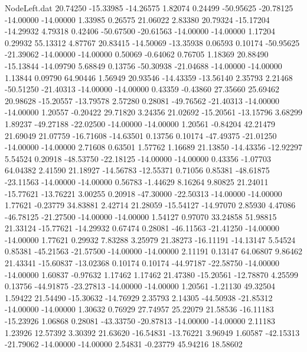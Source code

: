 \begin{filecontents}{NodeLeft.dat}
  20.74250  -15.33985  -14.26575     1.82074    0.24499  -50.95625  -20.78125  -14.00000  -14.00000    1.33985    0.26575   21.06022    2.83380
  20.79324  -15.17204  -14.29932     4.79318    0.42406  -50.67500  -20.61563  -14.00000  -14.00000    1.17204    0.29932   55.13312    4.87767
  20.83415  -14.50069  -13.35938     0.06593    0.10174  -50.95625  -21.39062  -14.00000  -14.00000    0.50069   -0.64062    0.76705    1.18369
  20.88490  -15.13844  -14.09790     5.68849    0.13756  -50.30938  -21.04688  -14.00000  -14.00000    1.13844    0.09790   64.90446    1.56949
  20.93546  -14.43359  -13.56140     2.35793    2.21468  -50.51250  -21.40313  -14.00000  -14.00000    0.43359   -0.43860   27.35660   25.69462
  20.98628  -15.20557  -13.79578     2.57280    0.28081  -49.76562  -21.40313  -14.00000  -14.00000    1.20557   -0.20422   29.71820    3.24356
  21.02692  -15.20561  -13.15796     3.68299    1.89237  -49.27188  -22.02500  -14.00000  -14.00000    1.20561   -0.84204   42.21479   21.69049
  21.07759  -16.71608  -14.63501     0.13756    0.10174  -47.49375  -21.01250  -14.00000  -14.00000    2.71608    0.63501    1.57762    1.16689
  21.13850  -14.43356  -12.92297     5.54524    0.20918  -48.53750  -22.18125  -14.00000  -14.00000    0.43356   -1.07703   64.04382    2.41590
  21.18927  -14.56783  -12.55371     0.71056    0.85381  -48.61875  -23.11563  -14.00000  -14.00000    0.56783   -1.44629    8.16264    9.80825
  21.24011  -15.77621  -13.76221     3.00255    0.20918  -47.30000  -22.50313  -14.00000  -14.00000    1.77621   -0.23779   34.83881    2.42714
  21.28059  -15.54127  -14.97070     2.85930    4.47086  -46.78125  -21.27500  -14.00000  -14.00000    1.54127    0.97070   33.24858   51.98815
  21.33124  -15.77621  -14.29932     0.67474    0.28081  -46.11563  -21.41250  -14.00000  -14.00000    1.77621    0.29932    7.83288    3.25979
  21.38273  -16.11191  -14.13147     5.54524    0.85381  -45.21563  -21.57500  -14.00000  -14.00000    2.11191    0.13147   64.06807    9.86462
  21.43341  -15.60837  -13.02368     0.10174    0.10174  -44.97187  -22.58750  -14.00000  -14.00000    1.60837   -0.97632    1.17462    1.17462
  21.47380  -15.20561  -12.78870     4.25599    0.13756  -44.91875  -23.27813  -14.00000  -14.00000    1.20561   -1.21130   49.32504    1.59422
  21.54490  -15.30632  -14.76929     2.35793    2.14305  -44.50938  -21.85312  -14.00000  -14.00000    1.30632    0.76929   27.74957   25.22079
  21.58536  -16.11183  -15.23926     1.06868    0.28081  -43.33750  -20.87813  -14.00000  -14.00000    2.11183    1.23926   12.57392    3.30392
  21.63620  -16.54831  -13.76221     3.96949    1.60587  -42.15313  -21.79062  -14.00000  -14.00000    2.54831   -0.23779   45.94216   18.58602

\end{filecontents}
